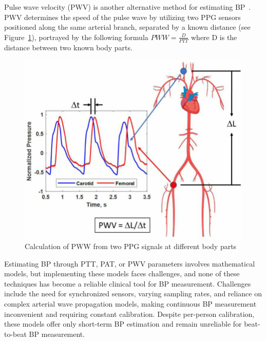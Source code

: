 Pulse wave velocity (PWV) is another alternative method for estimating BP~\cite{mccombieAdaptiveBloodPressure2006}.
PWV determines the speed of the pulse wave by utilizing two PPG sensors positioned along the same arterial branch, separated by a known distance (see Figure~\ref{fig:pww}), portrayed by the following formula
\begin{math}
    PWW = \frac{D}{PTT}
\end{math}
where D is the distance between two known body parts.
\begin{figure}[h]
    \centering
    \includegraphics[scale=0.4]{images/sp/pww}
    \caption{Calculation of PWW from two PPG signals at different body parts~\cite{urbanUnderstandingArterialBiomechanics2023}}
    \label{fig:pww}
\end{figure}

Estimating BP through PTT, PAT, or PWV parameters involves mathematical models, but implementing these models faces challenges, and none of these techniques has become a reliable clinical tool for BP measurement.
Challenges include the need for synchronized sensors, varying sampling rates, and reliance on complex arterial wave propagation models, making continuous BP measurement inconvenient and requiring constant calibration.
Despite per-person calibration, these models offer only short-term BP estimation and remain unreliable for beat-to-beat BP measurement.

